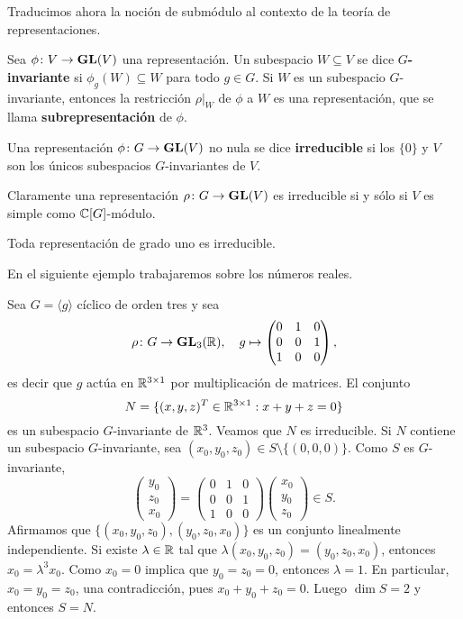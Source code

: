 Traducimos ahora la noción de submódulo al contexto de la teoría de representaciones. 

\begin{definition}
Sea $\phi\colon V\to\mathbf{GL}(V)$ una representación. 
Un subespacio $W\subseteq V$ se dice
\textbf{$G$-invariante} si $\phi_g(W)\subseteq W$ para todo $g\in G$.  Si $W$
es un subespacio $G$-invariante, entonces la restricción $\rho|_W$ de $\phi$
a $W$ es una representación, que se llama \textbf{subrepresentación} de
$\phi$.
\end{definition}

\begin{definition}
Una representación $\phi\colon G\to\mathbf{GL}(V)$ no nula se dice \textbf{irreducible} si los $\{0\}$
y $V$ son los únicos subespacios $G$-invariantes de $V$.
\end{definition}

Claramente una representación $\rho\colon G\to\mathbf{GL}(V)$ es irreducible si y sólo si $V$ es
simple como $\mathbb{C}[G]$-módulo.

\begin{example}
  Toda representación de grado uno es irreducible.
\end{example}

En el siguiente ejemplo trabajaremos sobre los números reales. 

\begin{example}
Sea $G=\langle g\rangle$ cíclico de orden tres y sea 
\[
\rho\colon G\to\mathbf{GL}_3(\mathbb{R}),\quad
g\mapsto\begin{pmatrix}
  0&1&0\\
  0&0&1\\
  1&0&0
\end{pmatrix},
\]
es decir que $g$ actúa en $\mathbb{R}^{3\times1}$ por multiplicación de matrices. 
El conjunto
\[
N=\{(x,y,z)^T\in\mathbb{R}^{3\times1}:x+y+z=0\}
\]
es un subespacio $G$-invariante de $\mathbb{R}^3$. Veamos que $N$ es irreducible. Si $N$ contiene un subespacio $G$-invariante, 
sea $(x_0,y_0,z_0)\in S\setminus\{(0,0,0)\}$. Como $S$ es $G$-invariante, 
\[
\begin{pmatrix}
y_0\\
z_0\\
x_0
\end{pmatrix}
=
\begin{pmatrix}
  0&1&0\\
  0&0&1\\
  1&0&0
\end{pmatrix}
\begin{pmatrix}
x_0\\
y_0\\
z_0
\end{pmatrix}\in S.
\]
Afirmamos
que $\{(x_0,y_0,z_0),(y_0,z_0,x_0)\}$ es un conjunto linealmente independiente. Si existe $\lambda\in\mathbb{R}$ 
tal que $\lambda(x_0,y_0,z_0)=(y_0,z_0,x_0)$, entonces $x_0=\lambda^3 x_0$. Como $x_0=0$ implica que 
$y_0=z_0=0$, entonces $\lambda=1$. En particular, $x_0=y_0=z_0$, una contradicción, pues $x_0+y_0+z_0=0$. 
Luego $\dim S=2$ y entonces
$S=N$. 
\end{example}

